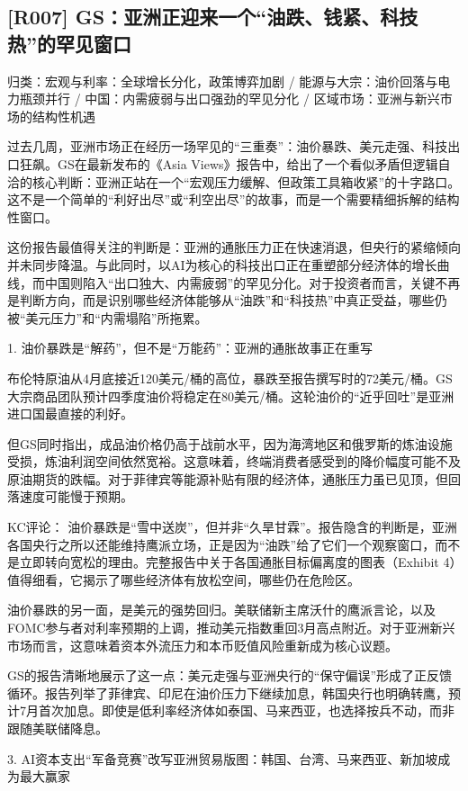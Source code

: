 \documentclass[11pt]{ctexart}
\begin{document}
\subsection{[R007] GS：亚洲正迎来一个“油跌、钱紧、科技热”的罕见窗口}
{\small\color{refgray}归类：宏观与利率：全球增长分化，政策博弈加剧 / 能源与大宗：油价回落与电力瓶颈并行 / 中国：内需疲弱与出口强劲的罕见分化 / 区域市场：亚洲与新兴市场的结构性机遇}

过去几周，亚洲市场正在经历一场罕见的“三重奏”：油价暴跌、美元走强、科技出口狂飙。GS在最新发布的《Asia Views》报告中，给出了一个看似矛盾但逻辑自洽的核心判断：亚洲正站在一个“宏观压力缓解、但政策工具箱收紧”的十字路口。这不是一个简单的“利好出尽”或“利空出尽”的故事，而是一个需要精细拆解的结构性窗口。

这份报告最值得关注的判断是：亚洲的通胀压力正在快速消退，但央行的紧缩倾向并未同步降温。与此同时，以AI为核心的科技出口正在重塑部分经济体的增长曲线，而中国则陷入“出口独大、内需疲弱”的罕见分化。对于投资者而言，关键不再是判断方向，而是识别哪些经济体能够从“油跌”和“科技热”中真正受益，哪些仍被“美元压力”和“内需塌陷”所拖累。

1. 油价暴跌是“解药”，但不是“万能药”：亚洲的通胀故事正在重写

布伦特原油从4月底接近120美元/桶的高位，暴跌至报告撰写时的72美元/桶。GS大宗商品团队预计四季度油价将稳定在80美元/桶。这轮油价的“近乎回吐”是亚洲进口国最直接的利好。

但GS同时指出，成品油价格仍高于战前水平，因为海湾地区和俄罗斯的炼油设施受损，炼油利润空间依然宽裕。这意味着，终端消费者感受到的降价幅度可能不及原油期货的跌幅。对于菲律宾等能源补贴有限的经济体，通胀压力虽已见顶，但回落速度可能慢于预期。

KC评论： 油价暴跌是“雪中送炭”，但并非“久旱甘霖”。报告隐含的判断是，亚洲各国央行之所以还能维持鹰派立场，正是因为“油跌”给了它们一个观察窗口，而不是立即转向宽松的理由。完整报告中关于各国通胀目标偏离度的图表（Exhibit 4）值得细看，它揭示了哪些经济体有放松空间，哪些仍在危险区。

油价暴跌的另一面，是美元的强势回归。美联储新主席沃什的鹰派言论，以及FOMC参与者对利率预期的上调，推动美元指数重回3月高点附近。对于亚洲新兴市场而言，这意味着资本外流压力和本币贬值风险重新成为核心议题。

GS的报告清晰地展示了这一点：美元走强与亚洲央行的“保守偏误”形成了正反馈循环。报告列举了菲律宾、印尼在油价压力下继续加息，韩国央行也明确转鹰，预计7月首次加息。即使是低利率经济体如泰国、马来西亚，也选择按兵不动，而非跟随美联储降息。

3. AI资本支出“军备竞赛”改写亚洲贸易版图：韩国、台湾、马来西亚、新加坡成为最大赢家
\end{document}

